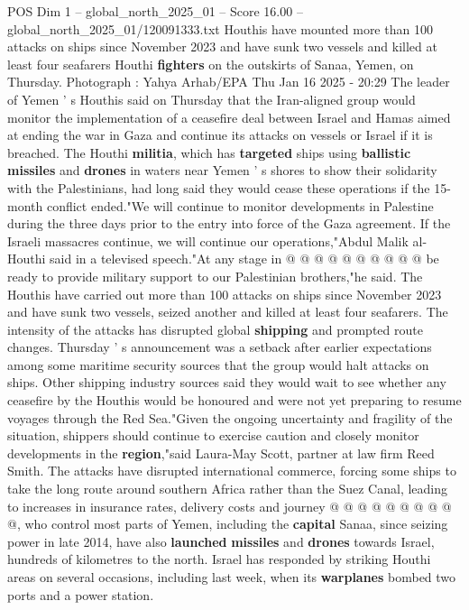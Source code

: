 \begin{textsample}{POS Dim 1 – global\_north\_2025\_01 – Score 16.00 – global\_north\_2025\_01/120091333.txt}  \label{ex:f1_pos_395}
Houthis have mounted more than 100 attacks on ships since November 2023 and have sunk two vessels and killed at least four seafarers Houthi \textbf{fighters} on the outskirts of Sanaa, Yemen, on Thursday.
Photograph : Yahya Arhab/EPA Thu Jan 16 2025 - 20:29 The leader of Yemen ' s Houthis said on Thursday that the Iran-aligned group would monitor the implementation of a ceasefire deal between Israel and Hamas aimed at ending the war in Gaza and continue its attacks on vessels or Israel if it is breached.
The Houthi \textbf{militia}, which has \textbf{targeted} ships using \textbf{ballistic} \textbf{missiles} and \textbf{drones} in waters near Yemen ' s shores to show their solidarity with the Palestinians, had long said they would cease these operations if the 15-month conflict ended."We will continue to monitor developments in Palestine during the three days prior to the entry into force of the Gaza agreement.
If the Israeli massacres continue, we will continue our operations,"Abdul Malik al-Houthi said in a televised speech."At any stage in @ @ @ @ @ @ @ @ @ @ be ready to provide military support to our Palestinian brothers,"he said.
The Houthis have carried out more than 100 attacks on ships since November 2023 and have sunk two vessels, seized another and killed at least four seafarers.
The intensity of the attacks has disrupted global \textbf{shipping} and prompted route changes.
Thursday ' s announcement was a setback after earlier expectations among some maritime security sources that the group would halt attacks on ships.
Other shipping industry sources said they would wait to see whether any ceasefire by the Houthis would be honoured and were not yet preparing to resume voyages through the Red Sea."Given the ongoing uncertainty and fragility of the situation, shippers should continue to exercise caution and closely monitor developments in the \textbf{region},"said Laura-May Scott, partner at law firm Reed Smith.
The attacks have disrupted international commerce, forcing some ships to take the long route around southern Africa rather than the Suez Canal, leading to increases in insurance rates, delivery costs and journey @ @ @ @ @ @ @ @ @ @, who control most parts of Yemen, including the \textbf{capital} Sanaa, since seizing power in late 2014, have also \textbf{launched} \textbf{missiles} and \textbf{drones} towards Israel, hundreds of kilometres to the north.
Israel has responded by striking Houthi areas on several occasions, including last week, when its \textbf{warplanes} bombed two ports and a power station.

\end{textsample}
